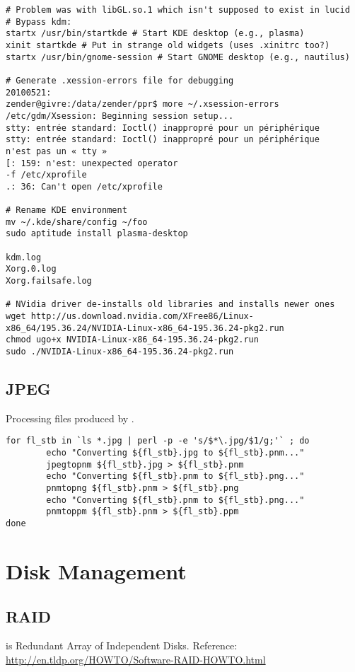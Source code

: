 \documentclass[12pt,twoside]{article}
\begin{document}
\begin{verbatim}
# Problem was with libGL.so.1 which isn't supposed to exist in lucid
# Bypass kdm:
startx /usr/bin/startkde # Start KDE desktop (e.g., plasma)
xinit startkde # Put in strange old widgets (uses .xinitrc too?)
startx /usr/bin/gnome-session # Start GNOME desktop (e.g., nautilus)

# Generate .xession-errors file for debugging
20100521:
zender@givre:/data/zender/ppr$ more ~/.xsession-errors
/etc/gdm/Xsession: Beginning session setup...
stty: entrée standard: Ioctl() inappropré pour un périphérique
stty: entrée standard: Ioctl() inappropré pour un périphérique
n'est pas un « tty »
[: 159: n'est: unexpected operator
-f /etc/xprofile
.: 36: Can't open /etc/xprofile

# Rename KDE environment
mv ~/.kde/share/config ~/foo
sudo aptitude install plasma-desktop

kdm.log  
Xorg.0.log
Xorg.failsafe.log

# NVidia driver de-installs old libraries and installs newer ones
wget http://us.download.nvidia.com/XFree86/Linux-x86_64/195.36.24/NVIDIA-Linux-x86_64-195.36.24-pkg2.run
chmod ugo+x NVIDIA-Linux-x86_64-195.36.24-pkg2.run
sudo ./NVIDIA-Linux-x86_64-195.36.24-pkg2.run
\end{verbatim}

\subsection{JPEG}\label{sxn:JPEG}
Processing  files produced by .
\begin{verbatim}
for fl_stb in `ls *.jpg | perl -p -e 's/$*\.jpg/$1/g;'` ; do
        echo "Converting ${fl_stb}.jpg to ${fl_stb}.pnm..."
        jpegtopnm ${fl_stb}.jpg > ${fl_stb}.pnm
        echo "Converting ${fl_stb}.pnm to ${fl_stb}.png..."
        pnmtopng ${fl_stb}.pnm > ${fl_stb}.png
        echo "Converting ${fl_stb}.pnm to ${fl_stb}.png..."
        pnmtoppm ${fl_stb}.pnm > ${fl_stb}.ppm
done
\end{verbatim}

\section{Disk Management}\label{sxn:dsk}

\subsection{RAID}\label{sxn:raid}
 is Redundant Array of Independent Disks.
Reference: \url{http://en.tldp.org/HOWTO/Software-RAID-HOWTO.html}
\end{document}
